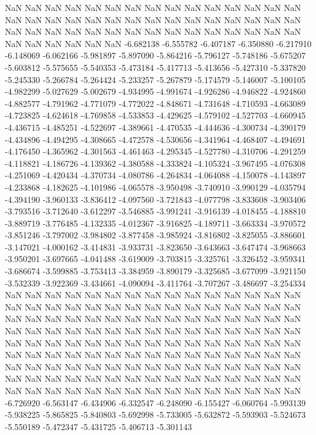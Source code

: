 NaN
NaN
NaN
NaN
NaN
NaN
NaN
NaN
NaN
NaN
NaN
NaN
NaN
NaN
NaN
NaN
NaN
NaN
NaN
NaN
NaN
NaN
NaN
NaN
NaN
NaN
NaN
NaN
NaN
NaN
NaN
NaN
NaN
NaN
NaN
NaN
NaN
NaN
NaN
NaN
NaN
NaN
NaN
NaN
NaN
NaN
NaN
NaN
NaN
NaN
NaN
-6.682138
-6.555782
-6.407187
-6.350880
-6.217910
-6.148069
-6.062166
-5.981897
-5.897090
-5.864216
-5.796127
-5.748186
-5.675207
-5.603812
-5.575655
-5.540353
-5.473184
-5.417713
-5.413656
-5.427310
-5.337820
-5.245330
-5.266784
-5.264424
-5.233257
-5.267879
-5.174579
-5.146007
-5.100105
-4.982299
-5.027629
-5.002679
-4.934995
-4.991674
-4.926286
-4.946822
-4.924860
-4.882577
-4.791962
-4.771079
-4.772022
-4.848671
-4.731648
-4.710593
-4.663089
-4.723825
-4.624618
-4.769858
-4.533853
-4.429625
-4.579102
-4.527703
-4.660945
-4.436715
-4.485251
-4.522697
-4.389661
-4.470535
-4.444636
-4.300734
-4.390179
-4.434896
-4.494295
-4.308665
-4.472578
-4.530656
-4.341964
-4.468407
-4.494691
-4.176450
-4.365962
-4.301563
-4.461463
-4.295345
-4.527780
-4.310706
-4.291259
-4.118821
-4.186726
-4.139362
-4.380588
-4.333824
-4.105324
-3.967495
-4.076308
-4.251069
-4.420434
-4.370734
-4.080786
-4.264834
-4.064088
-4.150078
-4.143897
-4.233868
-4.182625
-4.101986
-4.065578
-3.950498
-3.740910
-3.990129
-4.035794
-4.394190
-3.960133
-3.836412
-4.097560
-3.721843
-4.077798
-3.833608
-3.903406
-3.793516
-3.712640
-3.612297
-3.546885
-3.991241
-3.916139
-4.018455
-4.188810
-3.889719
-3.776485
-4.132335
-4.012367
-3.916825
-4.189711
-3.663334
-3.970572
-3.851246
-3.797002
-3.984802
-3.877458
-3.985924
-3.816802
-3.825055
-3.886601
-3.147021
-4.000162
-3.414831
-3.933731
-3.823650
-3.643663
-3.647474
-3.968663
-3.950201
-3.697665
-4.041488
-3.619009
-3.703815
-3.325761
-3.326452
-3.959341
-3.686674
-3.599885
-3.753413
-3.384959
-3.890179
-3.325685
-3.677099
-3.921150
-3.532339
-3.922369
-3.434661
-4.090094
-3.411764
-3.707267
-3.486697
-3.254334
NaN
NaN
NaN
NaN
NaN
NaN
NaN
NaN
NaN
NaN
NaN
NaN
NaN
NaN
NaN
NaN
NaN
NaN
NaN
NaN
NaN
NaN
NaN
NaN
NaN
NaN
NaN
NaN
NaN
NaN
NaN
NaN
NaN
NaN
NaN
NaN
NaN
NaN
NaN
NaN
NaN
NaN
NaN
NaN
NaN
NaN
NaN
NaN
NaN
NaN
NaN
NaN
NaN
NaN
NaN
NaN
NaN
NaN
NaN
NaN
NaN
NaN
NaN
NaN
NaN
NaN
NaN
NaN
NaN
NaN
NaN
NaN
NaN
NaN
NaN
NaN
NaN
NaN
NaN
NaN
NaN
NaN
NaN
NaN
NaN
NaN
NaN
NaN
NaN
NaN
NaN
NaN
NaN
NaN
NaN
NaN
NaN
NaN
NaN
NaN
NaN
NaN
NaN
NaN
NaN
NaN
NaN
NaN
NaN
NaN
NaN
NaN
NaN
NaN
NaN
NaN
NaN
NaN
NaN
NaN
NaN
NaN
NaN
NaN
NaN
NaN
NaN
NaN
NaN
NaN
NaN
NaN
NaN
NaN
NaN
-6.726920
-6.563147
-6.434906
-6.332547
-6.248090
-6.155427
-6.060764
-5.993139
-5.938225
-5.865825
-5.840803
-5.692998
-5.733005
-5.632872
-5.593903
-5.524673
-5.550189
-5.472347
-5.431725
-5.406713
-5.301143
